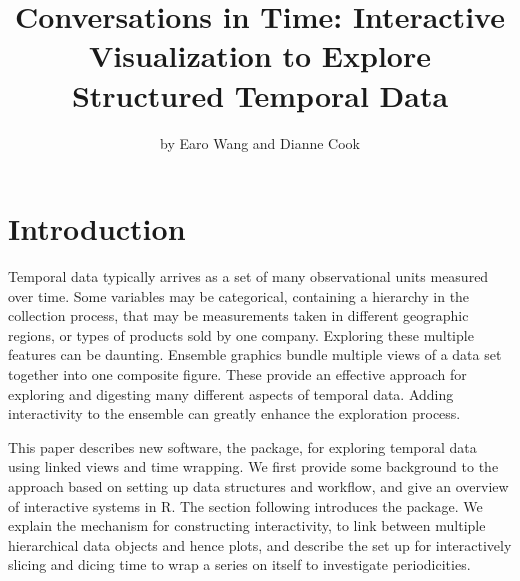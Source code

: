 \title{Conversations in Time: Interactive Visualization to Explore
Structured Temporal Data}
\author{by Earo Wang and Dianne Cook}

\maketitle


\hypertarget{introduction}{%
\section{Introduction}\label{introduction}}

Temporal data typically arrives as a set of many observational units
measured over time. Some variables may be categorical, containing a
hierarchy in the collection process, that may be measurements taken in
different geographic regions, or types of products sold by one company.
Exploring these multiple features can be daunting. Ensemble graphics
\citep{unwin_ensemble_2018} bundle multiple views of a data set together
into one composite figure. These provide an effective approach for
exploring and digesting many different aspects of temporal data. Adding
interactivity to the ensemble can greatly enhance the exploration
process.

This paper describes new software, the  package,
for exploring temporal data using linked views and time wrapping. We
first provide some background to the approach based on setting up data
structures and workflow, and give an overview of interactive systems in
R. The section following introduces the  package.
We explain the mechanism for constructing interactivity, to link between
multiple hierarchical data objects and hence plots, and describe the set
up for interactively slicing and dicing time to wrap a series on itself
to investigate periodicities.

